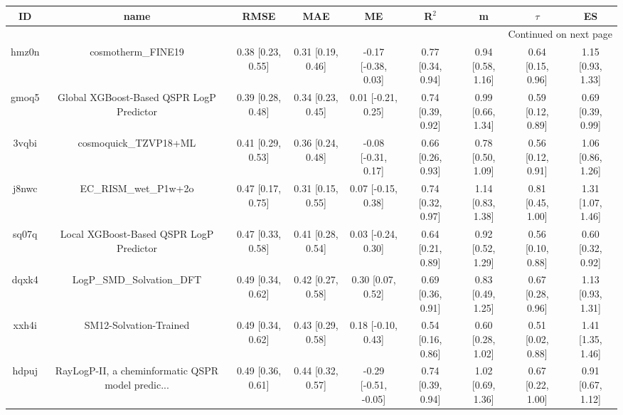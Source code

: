\documentclass{article}
\begin{document}
\begin{center}
\scriptsize
\begin{longtable}{|ccccccccc|}
\toprule
    ID &                                               name &               RMSE &                MAE &                    ME &              R$^2$ &                    m &               $\tau$ &                    ES \\
\midrule
\endhead
\midrule
\multicolumn{9}{r}{{Continued on next page}} \\
\midrule
\endfoot

\bottomrule
\endlastfoot
 hmz0n &                                 cosmotherm\_FINE19 &  0.38 [0.23, 0.55] &  0.31 [0.19, 0.46] &   -0.17 [-0.38, 0.03] &  0.77 [0.34, 0.94] &    0.94 [0.58, 1.16] &    0.64 [0.15, 0.96] &     1.15 [0.93, 1.33] \\
 gmoq5 &           Global XGBoost-Based QSPR LogP Predictor &  0.39 [0.28, 0.48] &  0.34 [0.23, 0.45] &    0.01 [-0.21, 0.25] &  0.74 [0.39, 0.92] &    0.99 [0.66, 1.34] &    0.59 [0.12, 0.89] &     0.69 [0.39, 0.99] \\
 3vqbi &                              cosmoquick\_TZVP18+ML &  0.41 [0.29, 0.53] &  0.36 [0.24, 0.48] &   -0.08 [-0.31, 0.17] &  0.66 [0.26, 0.93] &    0.78 [0.50, 1.09] &    0.56 [0.12, 0.91] &     1.06 [0.86, 1.26] \\
 j8nwc &                              EC\_RISM\_wet\_P1w+2o &  0.47 [0.17, 0.75] &  0.31 [0.15, 0.55] &    0.07 [-0.15, 0.38] &  0.74 [0.32, 0.97] &    1.14 [0.83, 1.38] &    0.81 [0.45, 1.00] &     1.31 [1.07, 1.46] \\
 sq07q &            Local XGBoost-Based QSPR LogP Predictor &  0.47 [0.33, 0.58] &  0.41 [0.28, 0.54] &    0.03 [-0.24, 0.30] &  0.64 [0.21, 0.89] &    0.92 [0.52, 1.29] &    0.56 [0.10, 0.88] &     0.60 [0.32, 0.92] \\
 dqxk4 &                          LogP\_SMD\_Solvation\_DFT &  0.49 [0.34, 0.62] &  0.42 [0.27, 0.58] &     0.30 [0.07, 0.52] &  0.69 [0.36, 0.91] &    0.83 [0.49, 1.25] &    0.67 [0.28, 0.96] &     1.13 [0.93, 1.31] \\
 xxh4i &                             SM12-Solvation-Trained &  0.49 [0.34, 0.62] &  0.43 [0.29, 0.58] &    0.18 [-0.10, 0.43] &  0.54 [0.16, 0.86] &    0.60 [0.28, 1.02] &    0.51 [0.02, 0.88] &     1.41 [1.35, 1.46] \\
 hdpuj &  RayLogP-II, a cheminformatic QSPR model predic... &  0.49 [0.36, 0.61] &  0.44 [0.32, 0.57] &  -0.29 [-0.51, -0.05] &  0.74 [0.39, 0.94] &    1.02 [0.69, 1.36] &    0.67 [0.22, 1.00] &     0.91 [0.67, 1.12] \\

\end{longtable}
\end{center}
\end{document}
